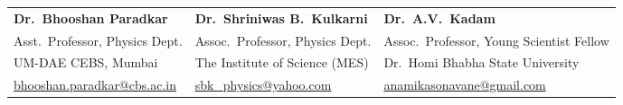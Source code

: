 \documentclass[a4paper,11pt]{article}
\begin{document}
\begin{tabularx}{\textwidth}{@{} X X X @{}}
  \textbf{Dr.\ Bhooshan Paradkar} &
  \textbf{Dr.\ Shriniwas B.\ Kulkarni} &
  \textbf{Dr.\ A.V.\ Kadam} \\

  Asst.\ Professor, Physics Dept. &
  Assoc.\ Professor, Physics Dept. &
  Assoc.\ Professor, Young Scientist Fellow \\

  UM-DAE CEBS, Mumbai &
  The Institute of Science (MES) &
  Dr.\ Homi Bhabha State University \\

  \href{mailto:bhooshan.paradkar@cbs.ac.in}{\small bhooshan.paradkar@cbs.ac.in} &
  \href{mailto:sbk_physics@yahoo.com}{\small sbk\_physics@yahoo.com} &
  \href{mailto:anamikasonavane@gmail.com}{\small anamikasonavane@gmail.com} \\
\end{tabularx}
\end{document}
